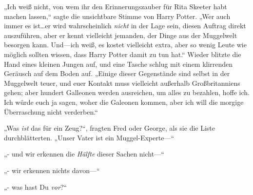 „Ich weiß nicht, von wem ihr den Erinnerungszauber für Rita Skeeter habt machen lassen,“ sagte die unsichtbare Stimme von Harry Potter. „Wer auch immer es ist…er wird wahrscheinlich \emph{nicht} in der Lage sein, diesen Auftrag direkt auszuführen, aber er kennt vielleicht jemanden, der Dinge aus der Muggelwelt besorgen kann. Und—ich weiß, es kostet vielleicht extra, aber so wenig Leute wie möglich sollten wissen, dass Harry Potter damit zu tun hat.“
Wieder blitzte die Hand eines kleinen Jungen auf, und eine Tasche schlug mit einem klirrenden Geräusch auf dem Boden auf.
„Einige dieser Gegenstände sind selbst in der Muggelwelt teuer, und euer Kontakt muss vielleicht außerhalb Großbritanniens gehen; aber hundert Galleonen werden ausreichen, um alles zu bezahlen, hoffe ich. Ich würde euch ja sagen, woher die Galeonen kommen, aber ich will die morgige Überraschung nicht verderben.“

„Was \emph{ist} das für ein Zeug?“, fragten Fred oder George, als sie die Liste durchblätterten.
„Unser Vater ist ein Muggel-Experte—“

„- und wir erkennen die \emph{Hälfte} dieser Sachen nicht—“

„- wir erkennen nichts davon—“

„- was hast Du \emph{vor}?“

